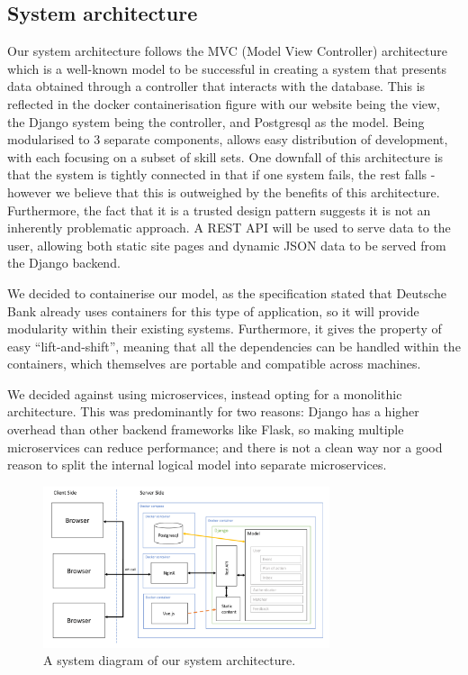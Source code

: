 \documentclass[10pt]{article}
\begin{document}
\subsection{System architecture}
Our system architecture follows the MVC (Model View Controller) architecture
which is a well-known model to be successful in creating a system that presents
data obtained through a controller that interacts with the database. This is
reflected in the docker containerisation figure with our website being the view,
the Django system being the controller, and Postgresql as the model. Being
modularised to 3 separate components, allows easy distribution of development,
with each focusing on a subset of skill sets. One downfall of this architecture
is that the system is tightly connected in that if one system fails, the rest
falls - however we believe that this is outweighed by the benefits of this
architecture. Furthermore, the fact that it is a trusted design pattern suggests
it is not an inherently problematic approach. A REST API will be used to serve
data to the user, allowing both static site pages and dynamic JSON data to be
served from the Django backend.

We decided to containerise our model, as the specification stated that Deutsche
Bank already uses containers for this type of application, so it will provide
modularity within their existing systems. Furthermore, it gives the property of
easy “lift-and-shift”, meaning that all the dependencies can be handled within
the containers, which themselves are portable and compatible across machines.

We decided against using microservices, instead opting for a monolithic
architecture. This was predominantly for two reasons: Django has a higher
overhead than other backend frameworks like Flask, so making multiple
microservices can reduce performance; and there is not a clean way nor a good
reason to split the internal logical model into separate microservices.

\begin{figure}[H]
    \centering
    \includegraphics[width=0.75\textwidth]{architecture}
    \caption{A system diagram of our system architecture.}
    \label{fig:system_architecture_diagram}
\end{figure}
\end{document}
